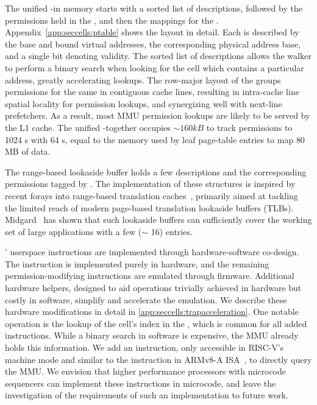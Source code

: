 The unified \ptable-\gtable in memory starts with a sorted
list of \cell descriptions, followed by the permissions held in the 
\ptable, and then the mappings for the \gtable.
Appendix~\ref{app:seccells:ptable} shows the layout in detail.
Each \cell is described by the base and bound virtual addresses, 
the corresponding physical address base, and a single bit denoting
validity.
The sorted list of \cell{} descriptions allows the \ptable walker to
perform a binary search when looking for the cell which contains a particular
address, greatly accelerating lookups.
The row-major layout of the \ptable groups permissions for the same \secdiv
in contiguous cache lines, resulting in intra-cache line spatial locality for
permission lookups, and synergizing well with next-line prefetchers.
As a result, most MMU permission lookups are likely to be served by the L1 cache.
The unified \ptable-\gtable together occupies $\sim160kB$ to track permissions
to 1024 \cell{}s with 64 \secdiv{}s, equal to the memory used by leaf 
page-table entries to map $80$MB of data.

The range-based lookaside buffer holds a few \cell{} descriptions
and the corresponding permissions tagged by \sid.
The implementation of these structures is inspired by recent forays into 
range-based translation caches~\cite{0003BOBFP21midgard, YanLNB19, BasuGCHS13}, 
primarily aimed at tackling the limited reach of modern page-based translation 
lookaside buffers (TLBs).
Midgard~\cite{0003BOBFP21midgard} has shown that such lookaside buffers can 
sufficiently cover the working set of large applications with a 
few ($\sim$ 16) entries.

\seccells' userspace instructions are implemented through 
hardware-software co-design.
The \sdswitch instruction is implemented purely in hardware, and the
remaining permission-modifying instructions are emulated through firmware.
Additional hardware helpers, designed to aid operations trivially achieved
in hardware but costly in software, simplify and accelerate the emulation.
We describe these hardware modifications in detail in
\autoref{app:seccells:trapacceleration}.
One notable operation is the lookup of the cell's index in the 
\ptable, which is common for all added instructions.
While a binary search in software is expensive, the MMU already holds this
information. 
We add an instruction, only accessible in RISC-V's machine mode and similar 
to the  instruction in ARMv8-A ISA~\cite{ARMAT}, to directly query the MMU.
We envision that higher performance processors with microcode sequencers
can implement these instructions in microcode, and
leave the investigation of the requirements of such an implementation
to future work.

